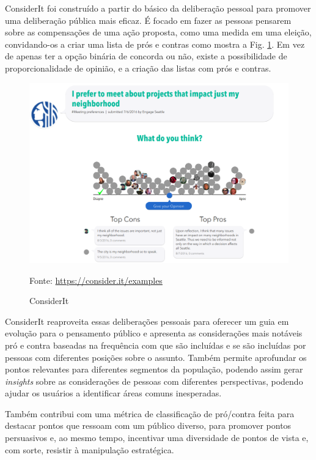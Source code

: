 ConsiderIt foi construído a partir do básico da deliberação pessoal para promover uma deliberação pública mais eficaz. É focado em fazer as pessoas pensarem sobre as compensações de uma ação proposta, como uma medida em uma eleição, convidando-os a criar uma lista de prós e contras como mostra a Fig. \ref{fig04}. Em vez de apenas ter a opção binária de concorda ou não, existe a possibilidade de proporcionalidade de opinião, e a criação das listas com prós e contras. 

\begin{figure}[h]
	\centering
	\includegraphics[keepaspectratio=true,scale=0.35]{figuras/considerit-tema2.png}
	\caption{ConsiderIt}
	Fonte: \url{https://consider.it/examples}
	\label{fig04}
\end{figure}


ConsiderIt reaproveita essas deliberações pessoais para oferecer um guia em evolução para o pensamento público e apresenta as considerações mais notáveis pró e contra baseadas na frequência com que são incluídas e se são incluídas por pessoas com diferentes posições sobre o assunto. Também permite aprofundar os pontos relevantes para diferentes segmentos da população, podendo assim gerar \textit{insights} sobre as considerações de pessoas com diferentes perspectivas, podendo ajudar os usuários a identificar áreas comuns inesperadas. 

Também contribui com uma métrica de classificação de pró/contra feita para destacar pontos que ressoam com um público diverso, para promover pontos persuasivos e, ao mesmo tempo, incentivar uma diversidade de pontos de vista e, com sorte, resistir à manipulação estratégica.


